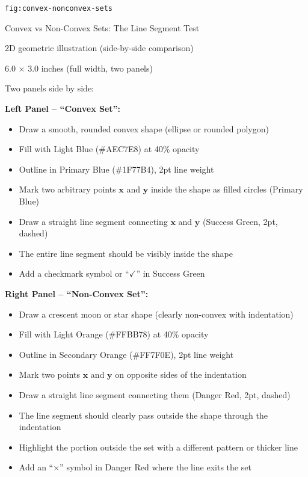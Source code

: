 \documentclass[12pt]{article}
\begin{document}
\begin{description}[style=nextline, leftmargin=0pt]
    \item[Figure ID] \texttt{fig:convex-nonconvex-sets}
    \item[Title] Convex vs Non-Convex Sets: The Line Segment Test
    \item[Type] 2D geometric illustration (side-by-side comparison)
    \item[Size] 6.0 $\times$ 3.0 inches (full width, two panels)

    \item[Visual Description]
    Two panels side by side:

    \textbf{Left Panel -- ``Convex Set'':}
    \begin{itemize}
        \item Draw a smooth, rounded convex shape (ellipse or rounded polygon)
        \item Fill with Light Blue (\#AEC7E8) at 40\% opacity
        \item Outline in Primary Blue (\#1F77B4), 2pt line weight
        \item Mark two arbitrary points $\mathbf{x}$ and $\mathbf{y}$ inside the shape as filled circles (Primary Blue)
        \item Draw a straight line segment connecting $\mathbf{x}$ and $\mathbf{y}$ (Success Green, 2pt, dashed)
        \item The entire line segment should be visibly inside the shape
        \item Add a checkmark symbol or ``$\checkmark$'' in Success Green
    \end{itemize}

    \textbf{Right Panel -- ``Non-Convex Set'':}
    \begin{itemize}
        \item Draw a crescent moon or star shape (clearly non-convex with indentation)
        \item Fill with Light Orange (\#FFBB78) at 40\% opacity
        \item Outline in Secondary Orange (\#FF7F0E), 2pt line weight
        \item Mark two points $\mathbf{x}$ and $\mathbf{y}$ on opposite sides of the indentation
        \item Draw a straight line segment connecting them (Danger Red, 2pt, dashed)
        \item The line segment should clearly pass outside the shape through the indentation
        \item Highlight the portion outside the set with a different pattern or thicker line
        \item Add an ``$\times$'' symbol in Danger Red where the line exits the set
    \end{itemize}


\end{description}
\end{document}
